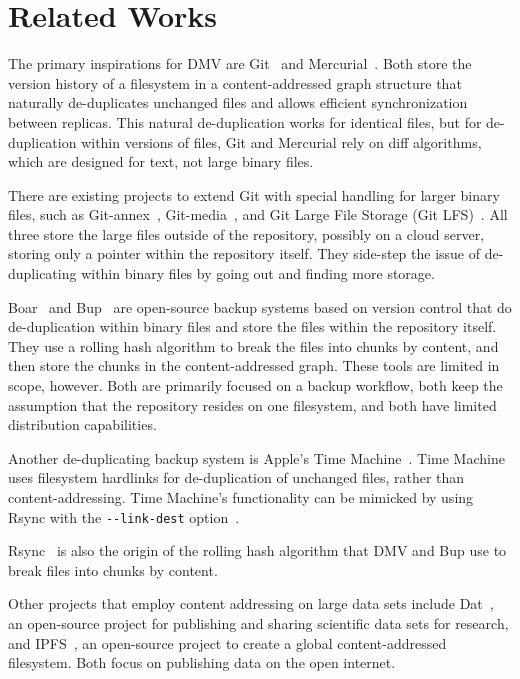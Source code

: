 \section{Related Works}

The primary inspirations for DMV are Git~\cite{git_book} and Mercurial~\cite{hgbook}.
Both store the version history of a filesystem in a content-addressed graph structure that naturally de-duplicates unchanged files and allows efficient synchronization between replicas.
This natural de-duplication works for identical files,
but for de-duplication within versions of files, Git and Mercurial rely on diff algorithms, which are designed for text, not large binary files.

There are existing projects to extend Git with special handling for larger binary files, such as Git-annex~\cite{git_annex_homepage}, Git-media~\cite{git_media_github}, and Git Large File Storage (Git LFS)~\cite{git_lfs_homepage}.
All three store the large files outside of the repository, possibly on a cloud server, storing only a pointer within the repository itself.
They side-step the issue of de-duplicating within binary files by going out and finding more storage.

Boar~\cite{boar_homepage} and Bup~\cite{bup_homepage} are open-source backup systems based on version control that do de-duplication within binary files and store the files within the repository itself.
They use a rolling hash algorithm to break the files into chunks by content, and then store the chunks in the content-addressed graph.
These tools are limited in scope, however.
Both are primarily focused on a backup workflow, both keep the assumption that the repository resides on one filesystem, and both have limited distribution capabilities.

Another de-duplicating backup system is Apple's Time Machine~\cite{timemachine_patent}.
Time Machine uses filesystem hardlinks for de-duplication of unchanged files, rather than content-addressing.
Time Machine's functionality can be mimicked by using Rsync with the \lstinline{--link-dest} option~\cite{timemachine_foreveryunix}.

Rsync~\cite{rsynctechreport} is also the origin of the rolling hash algorithm that DMV and Bup use to break files into chunks by content.

Other projects that employ content addressing on large data sets include
Dat~\cite{dat_homepage}, an open-source project for publishing and sharing scientific data sets for research, and IPFS~\cite{ipfs_github_main}, an open-source pro\-ject to create a global content-addressed filesystem.
Both focus on publishing data on the open internet.

